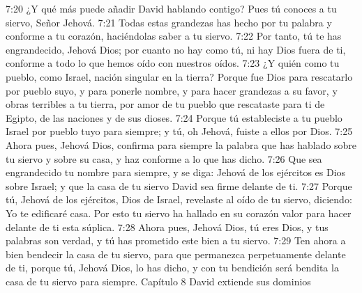 7:20 ¿Y qué más puede añadir David hablando contigo? Pues tú conoces a tu siervo, Señor Jehová.  
7:21 Todas estas grandezas has hecho por tu palabra y conforme a tu corazón, haciéndolas saber a tu siervo.  
7:22 Por tanto, tú te has engrandecido, Jehová Dios; por cuanto no hay como tú, ni hay Dios fuera de ti, conforme a todo lo que hemos oído con nuestros oídos.  
7:23 ¿Y quién como tu pueblo, como Israel, nación singular en la tierra? Porque fue Dios para rescatarlo por pueblo suyo, y para ponerle nombre, y para hacer grandezas a su favor, y obras terribles a tu tierra, por amor de tu pueblo que rescataste para ti de Egipto, de las naciones y de sus dioses.  
7:24 Porque tú estableciste a tu pueblo Israel por pueblo tuyo para siempre; y tú, oh Jehová, fuiste a ellos por Dios.  
7:25 Ahora pues, Jehová Dios, confirma para siempre la palabra que has hablado sobre tu siervo y sobre su casa, y haz conforme a lo que has dicho.  
7:26 Que sea engrandecido tu nombre para siempre, y se diga: Jehová de los ejércitos es Dios sobre Israel; y que la casa de tu siervo David sea firme delante de ti.  
7:27 Porque tú, Jehová de los ejércitos, Dios de Israel, revelaste al oído de tu siervo, diciendo: Yo te edificaré casa. Por esto tu siervo ha hallado en su corazón valor para hacer delante de ti esta súplica.  
7:28 Ahora pues, Jehová Dios, tú eres Dios, y tus palabras son verdad, y tú has prometido este bien a tu siervo.  
7:29 Ten ahora a bien bendecir la casa de tu siervo, para que permanezca perpetuamente delante de ti, porque tú, Jehová Dios, lo has dicho, y con tu bendición será bendita la casa de tu siervo para siempre.  
Capítulo 8
David extiende sus dominios  
 
